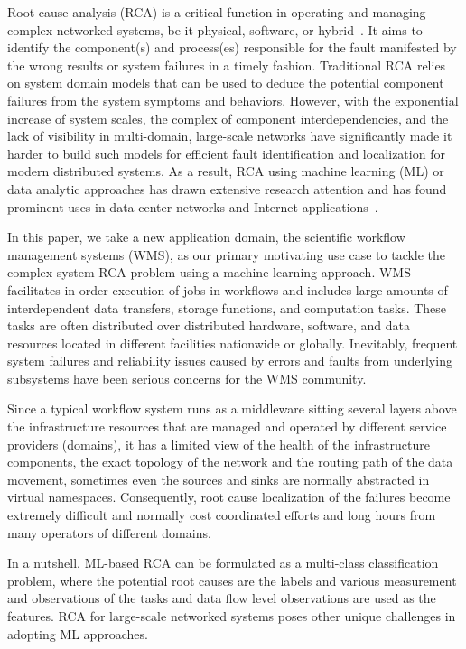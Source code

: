 Root cause analysis (RCA) is a critical function in operating and managing complex networked systems, be it physical, software, or hybrid~\cite{RCA-Review-2017}.
It aims to identify the component(s) and process(es) responsible for the fault manifested by the wrong results or system failures in a timely fashion.
Traditional RCA relies on system domain models that can be used to deduce the potential component failures from the system symptoms and behaviors.
However, with the exponential increase of system scales, the complex of component interdependencies, and the lack of visibility in multi-domain, large-scale networks have 
significantly made it harder to build such models for efficient fault identification and localization for modern distributed systems. 
As a result, RCA using machine learning (ML) or data analytic approaches has drawn extensive research attention and has found prominent uses
 in data center networks and Internet applications~\cite{netbouncer:nsdi18,Link-JIoT-2019,microrca:noms2020}. 

In this paper, we take a new application domain, the scientific workflow management systems (WMS), as our primary motivating use case to tackle the complex
 system RCA problem using a machine learning approach. WMS facilitates in-order execution of jobs in workflows and includes large amounts of interdependent
  data transfers, storage functions, and computation tasks. These tasks are often distributed over distributed hardware, software, and data resources
   located in different facilities nationwide or globally. Inevitably, frequent system failures and reliability issues 
caused by errors and faults from underlying subsystems have been serious concerns for the WMS community. 

Since a typical workflow system runs as a middleware sitting several layers above the infrastructure resources that are managed 
and operated by different service providers (domains), it has a limited view of the health of the infrastructure components, the exact topology of the network and the routing path of the data movement,
sometimes even the sources and sinks are normally abstracted in virtual namespaces. Consequently, root cause localization of the failures become extremely difficult and normally cost coordinated efforts and long hours 
from many operators of different domains. 

In a nutshell, ML-based RCA can be formulated as a multi-class classification problem, where the potential root causes are the labels and various 
measurement and observations of the tasks and data flow level observations are used as the features.
RCA for large-scale networked systems poses other unique challenges in adopting ML approaches.
 
